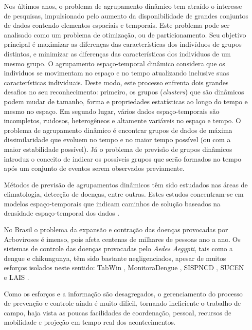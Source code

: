 Nos últimos anos, o problema de agrupamento dinâmico tem atraído o interesse de pesquisas, impulsionado pelo aumento da disponibilidade de grandes conjuntos de dados contendo elementos espaciais e temporais. Este problema pode ser analisado como um problema de otimização, ou de particionamento. Seu objetivo principal é maximizar as diferenças das características dos indivíduos de grupos distintos, e minimizar as diferenças das características dos indivíduos de um mesmo grupo. O agrupamento espaço-temporal dinâmico considera que os individuos se movimentam no espaço e no tempo atualizando inclusive suas características individuais. Deste modo, este processo enfrenta dois grandes desafios no seu reconhecimento: primeiro, os grupos (\textit{clusters}) que são dinâmicos podem mudar de tamanho, forma e propriedades estatísticas ao longo do tempo e mesmo no espaço. Em segundo lugar, vários dados espaço-temporais são incompletos, ruidosos, heterogêneos e altamente variáveis no espaço e tempo. O problema de agrupamento dinâmico é encontrar grupos de dados de máxima dissimilaridade que evoluem no tempo e no maior tempo possível (ou com a maior estabilidade possível). Já o problema de previsão de grupos dinâmicos introduz o conceito de indicar os possíveis grupos que serão formados no tempo após um conjunto de eventos serem observados previamente.

Métodos de previsão de agrupamentos dinâmicos têm sido estudados nas áreas de climatologia, detecção de doenças, entre outras. Estes estudos concentram-se em modelos espaço-temporais que indicam caminhos de solução baseados na densidade espaço-temporal dos dados \cite{gupta:2014}. 

No Brasil o problema da expansão e contração das doenças provocadas por Arboviroses é imenso, pois afeta centenas de milhares de pessoas ano a ano. Os sistemas de controle das doenças provocadas pelo \emph{Aedes Aegypti}, tais como a dengue e chikungunya, têm sido bastante negligenciados, apesar de muitos esforços isolados neste sentido: TabWin \cite{tabwin}, MonitoraDengue \cite{monitoraDengue}, \acrshort{SISPNCD} \cite{fad}, \acrshort{SUCEN} \cite{sucen} e \acrshort{LAIS} \cite{laisrn}.

Como os esforços e a informação são desagregados, o gerenciamento do processo de prevenção e controle ainda é muito difícil, tornando ineficiente o trabalho de campo, haja vista as poucas facilidades de coordenação, pessoal, recursos de mobilidade e projeção em tempo real dos acontecimentos.

